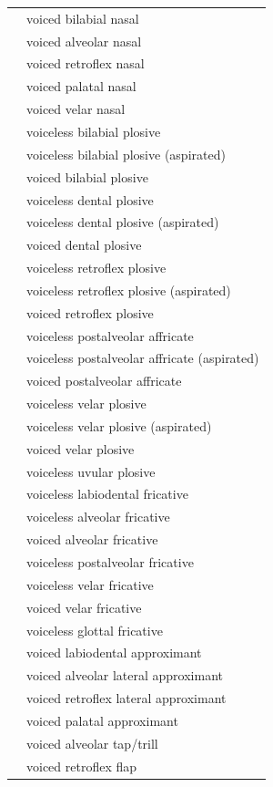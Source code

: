 \documentclass{article}
\begin{document}
\begin{xltabular}{\textwidth}{lL}
   & voiced bilabial nasal \\
   & voiced alveolar nasal \\
   & voiced retroflex nasal \\
   & voiced palatal nasal \\
   & voiced velar nasal \\
   & voiceless bilabial plosive \\
   & voiceless bilabial plosive (aspirated) \\
   & voiced bilabial plosive \\
   & voiceless dental plosive \\
   & voiceless dental plosive (aspirated) \\
   & voiced dental plosive \\
   & voiceless retroflex plosive \\
   & voiceless retroflex plosive (aspirated) \\
   & voiced retroflex plosive \\
   & voiceless postalveolar affricate \\
   & voiceless postalveolar affricate (aspirated) \\
   & voiced postalveolar affricate \\
   & voiceless velar plosive \\
   & voiceless velar plosive (aspirated) \\
   & voiced velar plosive \\
   & voiceless uvular plosive \\
   & voiceless labiodental fricative \\
   & voiceless alveolar fricative \\
   & voiced alveolar fricative \\
   & voiceless postalveolar fricative \\
   & voiceless velar fricative \\
   & voiced velar fricative \\
   & voiceless glottal fricative \\
   & voiced labiodental approximant \\
   & voiced alveolar lateral approximant \\
   & voiced retroflex lateral approximant \\
   & voiced palatal approximant \\
   & voiced alveolar tap/trill \\
   & voiced retroflex flap \\
\end{xltabular}
\end{document}
